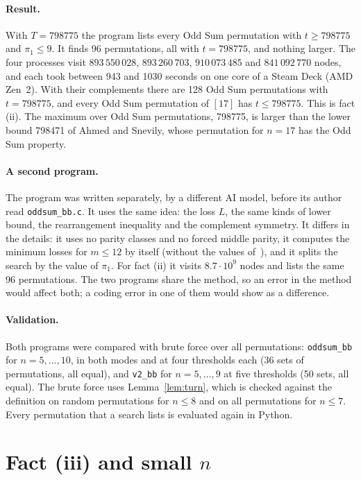 \documentclass[11pt]{article}
\theoremstyle{remark}
\begin{document}
\paragraph{Result.}
With $T = 798775$ the program lists every Odd Sum permutation with $t \ge 798775$ and $\pi_1 \le 9$. It finds 96 permutations, all with $t = 798775$, and nothing larger. The four processes visit $893\,550\,028$, $893\,260\,703$, $910\,073\,485$ and $841\,092\,770$ nodes, and each took between 943 and 1030 seconds on one core of a Steam Deck (AMD Zen~2). With their complements there are 128 Odd Sum permutations with $t = 798775$, and every Odd Sum permutation of $[17]$ has $t \le 798775$. This is fact (ii). The maximum over Odd Sum permutations, 798775, is larger than the lower bound 798471 of Ahmed and Snevily, whose permutation for $n = 17$ has the Odd Sum property.

\paragraph{A second program.}
The program  was written separately, by a different AI model, before its author read \texttt{oddsum\_bb.c}. It uses the same idea: the loss $L$, the same kinds of lower bound, the rearrangement inequality and the complement symmetry. It differs in the details: it uses no parity classes and no forced middle parity, it computes the minimum losses for $m \le 12$ by itself (without the values of~\cite{AS}), and it splits the search by the value of $\pi_1$. For fact (ii) it visits $8.7 \cdot 10^9$ nodes and lists the same 96 permutations. The two programs share the method, so an error in the method would affect both; a coding error in one of them would show as a difference.

\paragraph{Validation.}
Both programs were compared with brute force over all permutations: \texttt{oddsum\_bb} for $n = 5, \dots, 10$, in both modes and at four thresholds each (36 sets of permutations, all equal), and \texttt{v2\_bb} for $n = 5, \dots, 9$ at five thresholds (50 sets, all equal). The brute force uses Lemma~\ref{lem:turn}, which is checked against the definition on random permutations for $n \le 8$ and on all permutations for $n \le 7$. Every permutation that a search lists is evaluated again in Python.

\section{Fact (iii) and small $n$}\label{sec:small}
\end{document}

